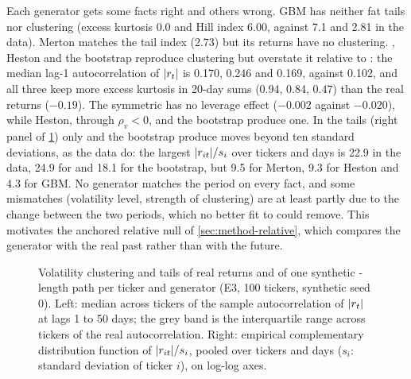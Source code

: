 Each generator gets some facts right and others wrong. GBM has neither fat tails nor clustering
(excess kurtosis 0.0 and Hill index 6.00, against 7.1 and 2.81 in the data). Merton matches the
tail index (2.73) but its \iid{} returns have no clustering. \GARCHt{}, Heston and the bootstrap
reproduce clustering but overstate it relative to \TEST{}: the median lag-1 autocorrelation of
$\lvert r_t\rvert$ is 0.170, 0.246 and 0.169, against 0.102, and all three keep more excess kurtosis in
20-day sums (0.94, 0.84, 0.47) than the real returns ($-0.19$). The symmetric \GARCHt{} has no
leverage effect ($-0.002$ against $-0.020$), while Heston, through $\rho_v<0$, and the bootstrap
produce one. In the tails (right panel of \cref{fig:e3-stylized}) only \GARCHt{} and the
bootstrap produce moves beyond ten \TRAIN{} standard deviations, as the data do: the largest $\lvert r_{it}\rvert/s_i$ over
tickers and days is 22.9 in the data, 24.9 for \GARCHt{} and 18.1 for the bootstrap, but 9.5
for Merton, 9.3 for Heston and 4.3 for GBM. No generator matches the \TEST{} period on every
fact, and some mismatches (volatility level, strength of clustering) are at least partly due to
the change between the two periods, which no better fit to \TRAIN{} could remove. This motivates
the anchored relative null of \cref{sec:method-relative}, which compares the
generator with the real past rather than with the future.

\begin{table}[tbp]
  \centering
  \caption{Stylized facts of real \TEST{} returns and of one synthetic \TEST{}-length path per
    ticker and generator (E3, 100 tickers, synthetic seed 0).}
  \label{tab:e3-stylized}
  \small
\end{table}

\begin{figure}[tbp]
  \centering
  \caption{Volatility clustering and tails of real \TEST{} returns and of one synthetic
    \TEST{}-length path per ticker and generator (E3, 100 tickers, synthetic seed 0). Left:
    median across tickers of the sample autocorrelation of $\lvert r_t\rvert$ at lags 1 to 50 days; the
    grey band is the interquartile range across tickers of the real autocorrelation. Right:
    empirical complementary distribution function of $\lvert r_{it}\rvert/s_i$, pooled over tickers and
    days ($s_i$: \TRAIN{} standard deviation of ticker $i$), on log-log axes.}
  \label{fig:e3-stylized}
\end{figure}
